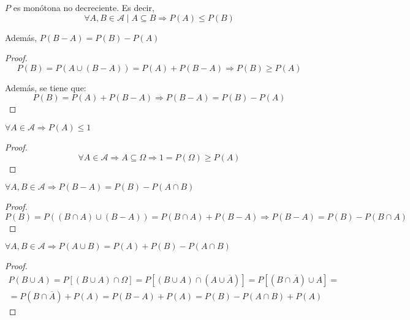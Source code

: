 \begin{prop}
    $P$ es monótona no decreciente. Es decir,
    $$\forall A,B \in \mathcal{A} \mid A \subseteq B \Rightarrow P(A) \leq P(B)$$
    
    Además, $P(B-A)=P(B)-P(A)$
\end{prop}
\begin{proof}
  $$P(B) = P(A \cup (B-A)) = P(A) + P(B-A) \Rightarrow P(B) \geq P(A)$$

    Además, se tiene que:
  $$P(B) = P(A) + P(B-A) \Rightarrow P(B-A) = P(B) - P(A)$$
\end{proof}

\begin{prop}
    $\forall A \in \mathcal{A} \Rightarrow P(A) \leq 1$
\end{prop}
\begin{proof}
  $$\forall A \in \mathcal{A} \Rightarrow A \subseteq \Omega \Rightarrow 1 = P(\Omega) \geq P(A)$$
\end{proof}

\begin{prop}
    $\forall A,B \in \mathcal{A} \Rightarrow P(B-A) = P(B) - P(A \cap B)$
\end{prop}
\begin{proof}
  $$P(B) = P((B \cap A) \cup (B-A)) = P(B \cap A) + P(B-A) \Rightarrow P(B-A) = P(B) - P(B \cap A)$$
\end{proof}

\begin{prop}
    $\forall A,B \in \mathcal{A} \Rightarrow P(A\cup B) = P(A) + P(B) -P(A \cap B)$
\end{prop}
\begin{proof}
    \begin{multline*}
        P(B \cup A)
        = P[(B \cup A) \cap \Omega]
        = P[(B \cup A) \cap (A \cup \overline{A})]
        = P[(B \cap \overline{A}) \cup A]
        =\\
        = P(B \cap \overline{A}) + P(A)
        = P(B-A) + P(A)
        = P(B) - P(A\cap B) + P(A)
    \end{multline*}
\end{proof}

